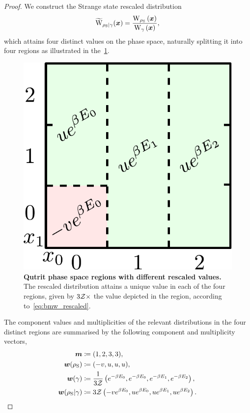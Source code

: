 \documentclass[pra,
aps,
twocolumn,
superscriptaddress,
groupedaddress,
nofootinbib,
reprint
]{revtex4-1}
\begin{document}
\begin{proof}
We construct the Strange state rescaled distribution 
\begin{equation}
	\widetilde{\rm{W}}_{\rho_{\rm{S}}|\gamma}(\bmx) = \frac{\W[\bmx]{\rho_{\rm{S}}}}{\W[\bmx]{\gamma}},
\end{equation}
which attains four distinct values on the phase space, naturally splitting it into four regions as illustrated in the~\cref{fig:pd_split_thermal}.
\begin{figure}[h]
    \centering
    \includegraphics[scale=0.5]{figs/pd_split_thermal.pdf}
    \caption{\textbf{Qutrit phase space regions with different rescaled values.}
    The rescaled distribution attains a unique value in each of the four regions, given by $3\mathcal{Z} \times$ the value depicted in the region, according to~\cref{eq:bmw_rescaled}.
    }
    \label{fig:pd_split_thermal}
\end{figure}

The component values and multiplicities of the relevant distributions in the four distinct regions are summarised by the following component and multiplicity vectors,
\begin{align}
	\bm{m} &\coloneqq (1,2,3,3), \\
	\bm{w}(\rho_{\rm{S}}) &\coloneqq (-v, u, u, u), \\
	\bm{w}(\gamma) &\coloneqq \frac{1}{3\mathcal{Z}} \left( e^{-\beta E_0}, e^{-\beta E_0}, e^{-\beta E_1}, e^{-\beta E_2} \right), \\
	\bm{w}(\rho_{\rm{S}} | \gamma) &\coloneqq 3\mathcal{Z} \left( -v e^{\beta E_0}, u e^{\beta E_0}, u e^{\beta E_1}, u e^{\beta E_2} \right). \label{eq:bmw_rescaled}
\end{align}


\end{proof}
\end{document}

